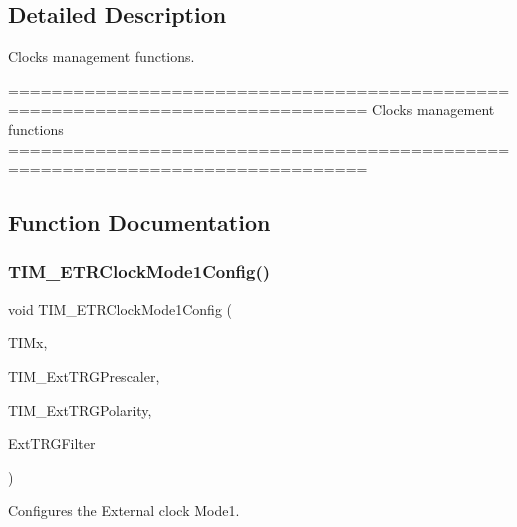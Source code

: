 \subsection{Detailed Description}
Clocks management functions. 

\begin{DoxyVerb} ===============================================================================
                         Clocks management functions
 ===============================================================================  \end{DoxyVerb}
 

\subsection{Function Documentation}
\mbox{\label{group__TIM__Group6_ga47c05638b93aabcd641dbc8859e1b2df}} 
\subsubsection{T\+I\+M\+\_\+\+E\+T\+R\+Clock\+Mode1\+Config()}
{\footnotesize\ttfamily void T\+I\+M\+\_\+\+E\+T\+R\+Clock\+Mode1\+Config (\begin{DoxyParamCaption}\item[{\textbf{ T\+I\+M\+\_\+\+Type\+Def} $\ast$}]{T\+I\+Mx,  }\item[{uint16\+\_\+t}]{T\+I\+M\+\_\+\+Ext\+T\+R\+G\+Prescaler,  }\item[{uint16\+\_\+t}]{T\+I\+M\+\_\+\+Ext\+T\+R\+G\+Polarity,  }\item[{uint16\+\_\+t}]{Ext\+T\+R\+G\+Filter }\end{DoxyParamCaption})}



Configures the External clock Mode1. 


